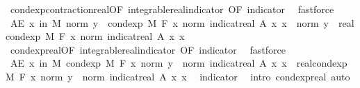 \begin{isabellebody}
\ cond{\isacharunderscore}{\kern0pt}exp{\isacharunderscore}{\kern0pt}contraction{\isacharunderscore}{\kern0pt}real{\isacharbrackleft}{\kern0pt}OF\ integrable{\isacharunderscore}{\kern0pt}real{\isacharunderscore}{\kern0pt}indicator{\isacharcomma}{\kern0pt}\ OF\ indicator{\isacharbrackright}{\kern0pt}\ \isamarkupfalse%
\ fastforce\isanewline
\isanewline
\ \ \isamarkupfalse%
\ {\isachardoublequoteopen}AE\ x\ in\ M{\isachardot}{\kern0pt}\ norm\ y\ {\isacharasterisk}{\kern0pt}\ cond{\isacharunderscore}{\kern0pt}exp\ M\ F\ {\isacharparenleft}{\kern0pt}{\isasymlambda}x{\isachardot}{\kern0pt}\ norm\ {\isacharparenleft}{\kern0pt}indicat{\isacharunderscore}{\kern0pt}real\ A\ x{\isacharparenright}{\kern0pt}{\isacharparenright}{\kern0pt}\ x\ {\isacharequal}{\kern0pt}\ norm\ y\ {\isacharasterisk}{\kern0pt}\ real{\isacharunderscore}{\kern0pt}cond{\isacharunderscore}{\kern0pt}exp\ M\ F\ {\isacharparenleft}{\kern0pt}{\isasymlambda}x{\isachardot}{\kern0pt}\ norm\ {\isacharparenleft}{\kern0pt}indicat{\isacharunderscore}{\kern0pt}real\ A\ x{\isacharparenright}{\kern0pt}{\isacharparenright}{\kern0pt}\ x{\isachardoublequoteclose}\ \isamarkupfalse%
\ cond{\isacharunderscore}{\kern0pt}exp{\isacharunderscore}{\kern0pt}real{\isacharbrackleft}{\kern0pt}OF\ integrable{\isacharunderscore}{\kern0pt}real{\isacharunderscore}{\kern0pt}indicator{\isacharcomma}{\kern0pt}\ OF\ indicator{\isacharbrackright}{\kern0pt}\ \isamarkupfalse%
\ fastforce\isanewline
\ \ \isamarkupfalse%
\ \isamarkupfalse%
\ {\isachardoublequoteopen}AE\ x\ in\ M{\isachardot}{\kern0pt}\ cond{\isacharunderscore}{\kern0pt}exp\ M\ F\ {\isacharparenleft}{\kern0pt}{\isasymlambda}x{\isachardot}{\kern0pt}\ norm\ y\ {\isacharasterisk}{\kern0pt}\ norm\ {\isacharparenleft}{\kern0pt}indicat{\isacharunderscore}{\kern0pt}real\ A\ x{\isacharparenright}{\kern0pt}{\isacharparenright}{\kern0pt}\ x\ {\isacharequal}{\kern0pt}\ real{\isacharunderscore}{\kern0pt}cond{\isacharunderscore}{\kern0pt}exp\ M\ F\ {\isacharparenleft}{\kern0pt}{\isasymlambda}x{\isachardot}{\kern0pt}\ norm\ y\ {\isacharasterisk}{\kern0pt}\ norm\ {\isacharparenleft}{\kern0pt}indicat{\isacharunderscore}{\kern0pt}real\ A\ x{\isacharparenright}{\kern0pt}{\isacharparenright}{\kern0pt}\ x{\isachardoublequoteclose}\ \isamarkupfalse%
\ indicator\ \isamarkupfalse%
\ {\isacharparenleft}{\kern0pt}intro\ cond{\isacharunderscore}{\kern0pt}exp{\isacharunderscore}{\kern0pt}real{\isacharcomma}{\kern0pt}\ auto{\isacharparenright}{\kern0pt}\isanewline

\end{isabellebody}
